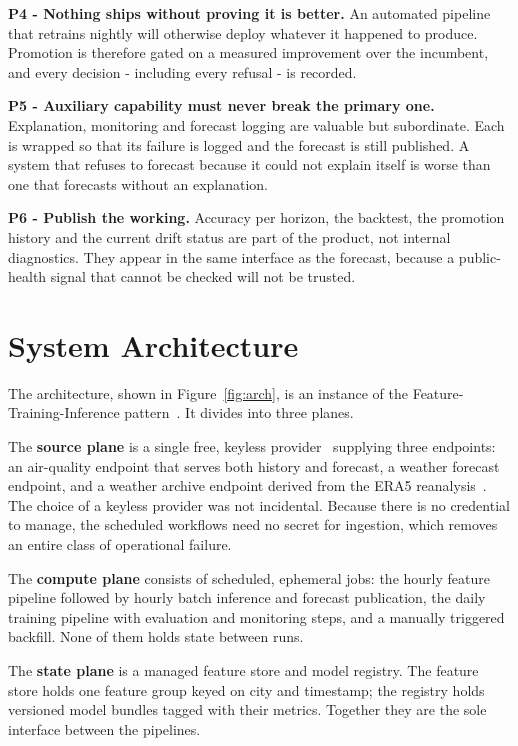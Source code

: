 \textbf{P4 - Nothing ships without proving it is better.} An automated pipeline
that retrains nightly will otherwise deploy whatever it happened to produce.
Promotion is therefore gated on a measured improvement over the incumbent, and
every decision - including every refusal - is recorded.

\textbf{P5 - Auxiliary capability must never break the primary one.}
Explanation, monitoring and forecast logging are valuable but subordinate. Each
is wrapped so that its failure is logged and the forecast is still published. A
system that refuses to forecast because it could not explain itself is worse than
one that forecasts without an explanation.

\textbf{P6 - Publish the working.} Accuracy per horizon, the backtest, the
promotion history and the current drift status are part of the product, not
internal diagnostics. They appear in the same interface as the forecast, because
a public-health signal that cannot be checked will not be trusted.

\section{System Architecture}
The architecture, shown in Figure~\ref{fig:arch}, is an instance of the
Feature-Training-Inference pattern~\cite{ref:fti}. It divides into three
planes.


The \textbf{source plane} is a single free, keyless provider~\cite{ref:openmeteo}
supplying three endpoints: an air-quality endpoint that serves both history and
forecast, a weather forecast endpoint, and a weather archive endpoint derived
from the ERA5 reanalysis~\cite{ref:era5}. The choice of a keyless provider was
not incidental. Because there is no credential to manage, the scheduled workflows
need no secret for ingestion, which removes an entire class of operational
failure.

The \textbf{compute plane} consists of scheduled, ephemeral jobs: the hourly
feature pipeline followed by hourly batch inference and forecast publication, the
daily training pipeline with evaluation and monitoring steps, and a manually triggered
backfill. None of them holds state between runs.

The \textbf{state plane} is a managed feature store and model registry. The
feature store holds one feature group keyed on city and timestamp; the registry
holds versioned model bundles tagged with their metrics. Together they are the
sole interface between the pipelines.

